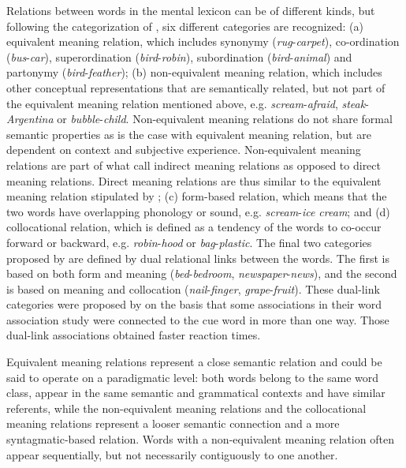 \documentclass[output=paper,colorlinks,citecolor=brown,nonflat]{langsci/langscibook}
\begin{document}
Relations between words in the mental lexicon can be of different kinds, but following the categorization of \citet{FitzpatrickIzura2011}, six different categories are recognized: (a) equivalent meaning relation, which includes synonymy (\textit{rug}{}-\textit{carpet}), co-ordination (\textit{bus}{}-\textit{car}), superordination (\textit{bird}{}-\textit{robin}), subordination (\textit{bird}{}-\textit{animal}) and partonymy (\textit{bird}{}-\textit{feather}); (b) non-equivalent meaning relation, which includes other conceptual representations that are semantically related, but not part of the equivalent meaning relation mentioned above, e.g. \textit{scream}{}-\textit{afraid}, \textit{steak}{}-\textit{Argentina} or \textit{bubble}{}-\textit{child}. Non-equivalent meaning relations do not share formal semantic properties as is the case with equivalent meaning relation, but are dependent on context and subjective experience. Non-equivalent meaning relations are part of what \citet[194]{CremerEtAl2010} call indirect meaning relations as opposed to direct meaning relations. Direct meaning relations are thus similar to the equivalent meaning relation stipulated by \citet{FitzpatrickIzura2011}; (c) form-based relation, which means that the two words have overlapping phonology or sound, e.g. \textit{scream}{}-\textit{ice cream}; and (d) collocational relation, which is defined as a tendency of the words to co-occur forward or backward, e.g. \textit{robin}{}-\textit{hood} or \textit{bag}{}-\textit{plastic}. The final two categories proposed by \citet{FitzpatrickIzura2011} are defined by dual relational links between the words. The first is based on both form and meaning (\textit{bed}{}-\textit{bedroom}, \textit{newspaper}{}-\textit{news}), and the second is based on meaning and collocation (\textit{nail}{}-\textit{finger}, \textit{grape}{}-\textit{fruit}). These dual-link categories were proposed by \citet{FitzpatrickIzura2011} on the basis that some associations in their word association study were connected to the cue word in more than one way. Those dual-link associations obtained faster reaction times.

Equivalent meaning relations represent a close semantic relation and could be said to operate on a paradigmatic level: both words belong to the same word class, appear in the same semantic and grammatical contexts and have similar referents, while the non-equivalent meaning relations and the collocational meaning relations represent a looser semantic connection and a more syntagmatic-based relation. Words with a non-equivalent meaning relation often appear sequentially, but not necessarily contiguously to one another.
\end{document}
